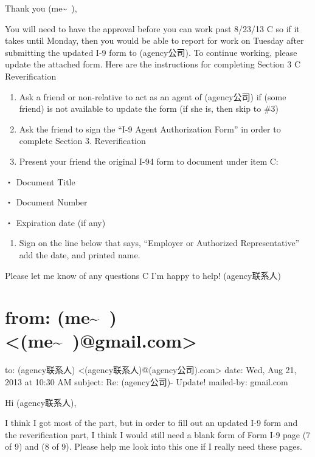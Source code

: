 \documentclass[12pt]{book}
\begin{document}
Thank you (me\textasciitilde{}~),

You will need to have the approval before you can work past 8/23/13 C so if it takes until Monday, then you would be able to report for work on Tuesday after submitting the updated I-9 form to (agency公司). To continue working, please update the attached form. Here are the instructions for completing Section 3 C Reverification

\begin{enumerate}
\item Ask a friend or non-relative to act as an agent of (agency公司) if (some friend) is not available to update the form (if she is, then skip to \#3)

\item Ask the friend to sign the “I-9 Agent Authorization Form” in order to complete Section 3. Reverification

\item Present your friend the original I-94 form to document under item C:
\end{enumerate}

・         Document Title

・         Document Number

・         Expiration date (if any)

\begin{enumerate}
\item Sign on the line below that says, “Employer or Authorized Representative” add the date, and printed name.
\end{enumerate}


Please let me know of any questions C I’m happy to help!
(agency联系人)


\section{from:         (me\textasciitilde{}~) <(me\textasciitilde{}~)@gmail.com>}
\label{sec-35-11}
to:         (agency联系人) <(agency联系人)@(agency公司).com>
date:         Wed, Aug 21, 2013 at 10:30 AM
subject:         Re: (agency公司)- Update!
mailed-by:         gmail.com

Hi (agency联系人), 

I think I got most of the part, but in order to fill out an updated I-9 form and the reverification part, I think I would still need a blank form of Form I-9 page (7 of 9) and (8 of 9). Please help me look into this one if I really need these pages.
\end{document}
